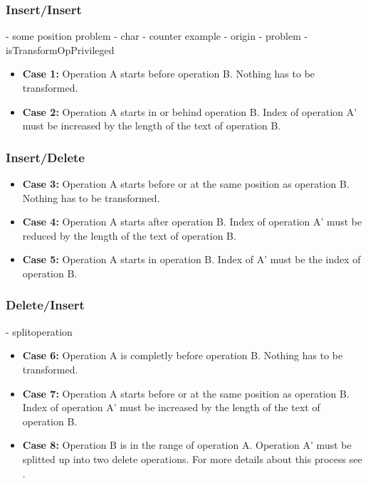 \subsubsection{Insert/Insert}
- some position problem
  - char
    - counter example
  - origin
    - problem
  - isTransformOpPrivileged
\begin{itemize}
\item \textbf{Case 1:}
Operation A starts before operation B. Nothing has to be transformed.
\item \textbf{Case 2:}
Operation A starts in or behind operation B. Index of operation A' must be increased by the length of the text of operation B.
\end{itemize}

\subsubsection{Insert/Delete}
\begin{itemize}
\item \textbf{Case 3:}
Operation A starts before or at the same position as operation B. Nothing has to be transformed.
\item \textbf{Case 4:}
Operation A starts after operation B. Index of operation A' must be reduced by the length of the text of operation B.
\item \textbf{Case 5:}
Operation A starts in operation B. Index of A' must be the index of operation B.
\end{itemize}

\subsubsection{Delete/Insert}
\label{Delete_Insert}
- splitoperation
\begin{itemize}
\item \textbf{Case 6:}
Operation A is completly before operation B. Nothing has to be transformed.
\item \textbf{Case 7:}
Operation A starts before or at the same position as operation B. Index of operation A' must be increased by the length of the text of operation B.
\item \textbf{Case 8:}
Operation B is in the range of operation A. Operation A' must be splitted up into two delete operations. For more details about this process see \cite{Delete_Insert}.
\end{itemize}

